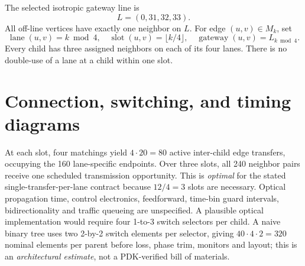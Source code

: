 \documentclass[10pt]{article}
\begin{document}
The selected isotropic gateway line is
\[
L=(0,31,32,33).
\]
All off-line vertices have exactly one neighbor on $L$.
For edge $(u,v)\in M_k$, set
\[
\operatorname{lane}(u,v)=k\bmod4,\quad
\operatorname{slot}(u,v)=\lfloor k/4\rfloor,\quad
\operatorname{gateway}(u,v)=L_{k\bmod4}.
\]
Every child has three assigned neighbors on each of its four lanes.
There is no double-use of a lane at a child within one slot.

\section{Connection, switching, and timing diagrams}
\begin{center}
\end{center}
At each slot, four matchings yield $4\cdot20=80$ active
inter-child edge transfers, occupying the 160 lane-specific
endpoints. Over three slots, all 240 neighbor pairs receive
one scheduled transmission opportunity.
This is \emph{optimal} for the stated single-transfer-per-lane
contract because $12/4=3$ slots are necessary. Optical propagation
time, control electronics, feedforward, time-bin guard intervals,
bidirectionality and traffic queueing are unspecified.
A plausible optical implementation would require four 1-to-3
switch selectors per child. A naive binary tree uses two 2-by-2
switch elements per selector, giving $40\cdot4\cdot2=320$ nominal
elements per parent before loss, phase trim, monitors and layout;
this is an \emph{architectural estimate}, not a PDK-verified bill
of materials.
\end{document}
